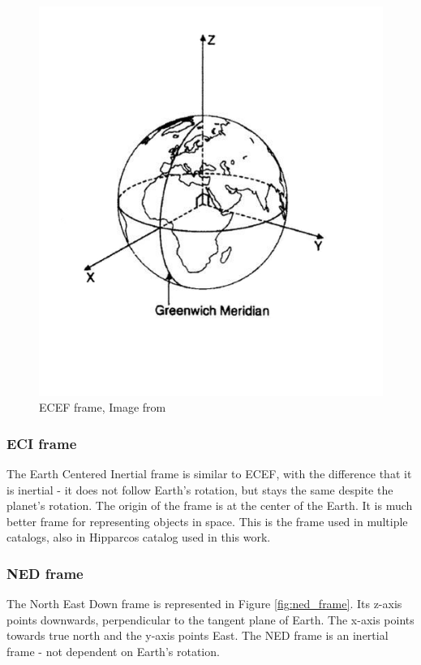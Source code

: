 \documentclass[12pt,a4paper,twoside]{article}
\begin{document}
\begin{figure}[!htb]
\includegraphics[scale=0.4]{eci_frame.jpg}
\centering
\caption[ECEF frame]{ECEF frame, Image from \citet{larson1992space}}
\label{fig:ecef_frame}
\end{figure}

\subsubsection{ECI frame}
The Earth Centered Inertial frame is similar to ECEF, with the difference that it is inertial - it does not follow Earth's rotation, but stays the same despite the planet's rotation. The origin of the frame is at the center of the Earth. It is much better frame for representing objects in space\cite{larson1992space}. This is the frame used in multiple catalogs, also in Hipparcos catalog used in this work.

\subsubsection{NED frame}
The North East Down frame is represented in Figure \ref{fig:ned_frame}. Its z-axis points downwards, perpendicular to the tangent plane of Earth. The x-axis points towards true north and the y-axis points East. The NED frame is an inertial frame - not dependent on Earth's rotation.
\end{document}
